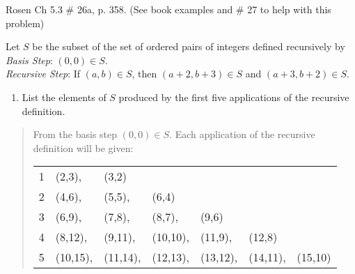 \begin{questions}
 Rosen Ch 5.3 \# 26a, p. 358. (See book examples and \#
27 to help with this problem)
\begin{solution}
Let $S$ be the subset of the set of ordered pairs of integers defined recursively by \\
\textit{Basis Step}: $(0,0) \in S$. \\
\textit{Recursive Step}: If $(a,b) \in S$, then $(a+2,b+3)\in S$ and $(a+3,b+2) \in S$. \\
\begin{enumerate}
    \item List the elements of $S$ produced by the first five applications of the recursive definition.
\end{enumerate}
\begin{quote}
    From the basis step $(0,0) \in S$.  Each application of the recursive definition will be given:

    \begin{tabular}{rllllll}
    1 & (2,3), & (3,2) \\
    2 & (4,6), & (5,5), & (6,4) \\
    3 & (6,9), & (7,8), & (8,7), & (9,6) \\
    4 & (8,12), & (9,11), & (10,10), & (11,9), & (12,8) \\
    5 & (10,15), & (11,14), & (12,13), & (13,12), & (14,11), & (15,10) \\
    \end{tabular}
\end{quote}
\end{solution}

\end{questions}
